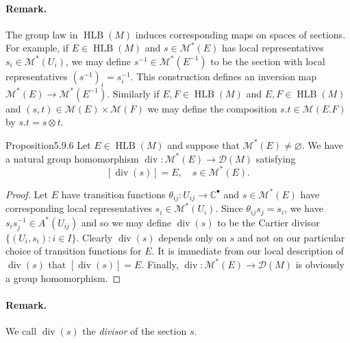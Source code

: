 \paragraph{Remark.} The group law in $\operatorname{HLB}(M)$ induces corresponding maps on spaces of sections. For example, if $E\in\operatorname{HLB}(M)$ and $s\in\mathcal M^*(E)$ has local representatives $s_i\in\mathcal M^*(U_i)$, we may define $s^{-1}\in\mathcal M^*(E^{-1})$ to be the section with local representatives $(s^{-1})_i=s_i^{-1}$. This construction defines an inversion map $\mathcal M^*(E)\to\mathcal M^*(E^{-1})$. Similarly if $E,F\in\operatorname{HLB}(M)$ and
$E,F\in\operatorname{HLB}(M)$ and $(s,t)\in\mathcal M(E)\times\mathcal M(F)$ we may define the composition $s.t\in\mathcal M(E.F)$ by $s.t=s\otimes t$.
\begin{originaltheorem}{Proposition}{5.9.6}
Let $E\in\operatorname{HLB}(M)$ and suppose that $\mathcal M^*(E)\neq\varnothing$. We have a natural group homomorphism $\operatorname{div}:\mathcal M^*(E)\to\mathcal D(M)$ satisfying
\[[\operatorname{div}(s)]=E,\quad s\in\mathcal M^*(E).\]
\end{originaltheorem}
\begin{proof}
Let $E$ have transition functions $\theta_{ij}:U_{ij}\to\mathbb C^\bullet$ and $s\in\mathcal M^*(E)$ have corresponding local representatives $s_i\in\mathcal M^*(U_i)$. Since $\theta_{ij}s_j=s_i$, we have $s_is_j^{-1}\in A^*(U_{ij})$ and so we may define $\operatorname{div}(s)$ to be the Cartier divisor $\{(U_i,s_i):i\in I\}$. Clearly $\operatorname{div}(s)$ depends only on $s$ and not on our particular choice of transition functions for $E$. It is immediate from our local description of $\operatorname{div}(s)$ that $[\operatorname{div}(s)]=E$. Finally, $\operatorname{div}:\mathcal M^*(E)\to\mathcal D(M)$ is obviously a group homomorphism.
\end{proof}
\paragraph{Remark.} We call $\operatorname{div}(s)$ the \emph{divisor} of the section $s$.
